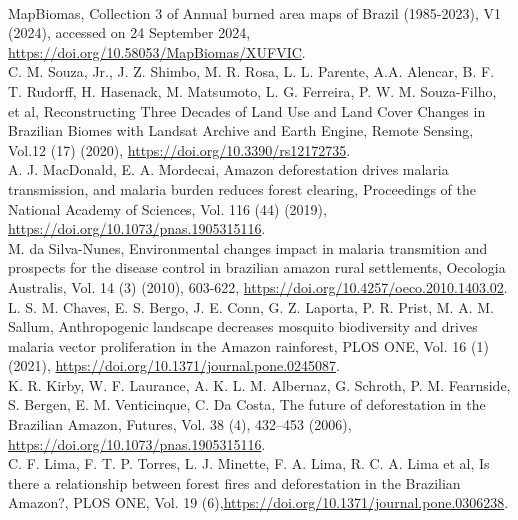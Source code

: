 \documentclass[a4paper,fleqn]{cas-dc}
\begin{document}
\begin{thebibliography}{00}
\\
 MapBiomas, Collection 3 of Annual burned area maps of Brazil (1985-2023), V1 (2024), accessed on 24 September 2024, \href{https://doi.org/10.58053/MapBiomas/XUFVIC}{https://doi.org/10.58053/MapBiomas/XUFVIC}.
\\
  C. M. Souza, Jr., J. Z. Shimbo,  M. R. Rosa,  L. L. Parente, A.A.  Alencar,  B. F. T. Rudorff, H. Hasenack, M. Matsumoto, L. G. Ferreira, P. W. M. Souza-Filho, et al, Reconstructing Three Decades of Land Use and Land Cover Changes in Brazilian Biomes with Landsat Archive and Earth Engine, Remote Sensing, Vol.12 (17) (2020), \href{https://doi.org/10.3390/rs12172735}{https://doi.org/10.3390/rs12172735}.
\\
 A. J. MacDonald, E. A. Mordecai, Amazon deforestation drives malaria transmission, and malaria burden reduces forest clearing, Proceedings of the National Academy of Sciences, Vol. 116 (44) (2019), \href{https://doi.org/10.1073/pnas.1905315116}{https://doi.org/10.1073/pnas.1905315116}.
\\
 M. da Silva-Nunes, Environmental changes impact in malaria transmition and prospects for the disease control in brazilian amazon rural settlements, Oecologia Australis, Vol. 14 (3) (2010), 603-622, \href{https://doi.org/10.4257/oeco.2010.1403.02}{https://doi.org/10.4257/oeco.2010.1403.02}.
\\
 L. S. M. Chaves, E. S. Bergo, J. E. Conn, G. Z. Laporta, P. R. Prist, M. A. M. Sallum, Anthropogenic landscape decreases mosquito biodiversity and drives malaria vector proliferation in the Amazon rainforest, PLOS ONE, Vol. 16 (1) (2021), \href{https://doi.org/10.1371/journal.pone.0245087}{https://doi.org/10.1371/journal.pone.0245087}.
\\
 K. R. Kirby, W. F. Laurance, A. K. L. M.  Albernaz, G. Schroth, P. M. Fearnside, S. Bergen, E. M. Venticinque, C. Da Costa, The future of deforestation in the Brazilian Amazon, Futures, Vol. 38 (4), 432–453 (2006), \href{https://doi.org/10.1073/pnas.1905315116}{https://doi.org/10.1073/pnas.1905315116}.
\\
 C. F. Lima, F. T. P. Torres, L. J. Minette, F. A. Lima, R. C. A. Lima et al, Is there a relationship between forest fires and deforestation in the Brazilian Amazon?, PLOS ONE, Vol. 19 (6),\href{https://doi.org/10.1371/journal.pone.0306238}{https://doi.org/10.1371/journal.pone.0306238}.

\end{thebibliography}
\end{document}
